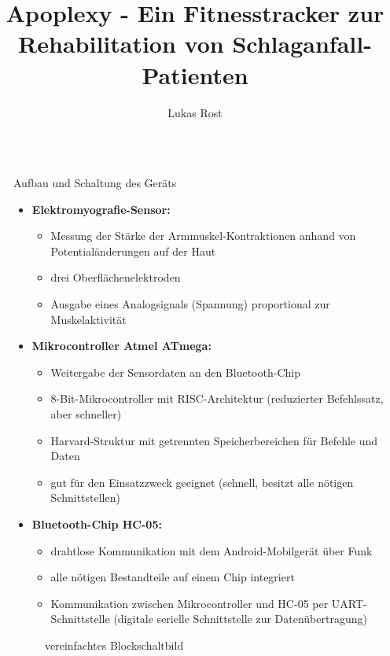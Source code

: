 \documentclass[final,20pt]{beamer}
\title{Apoplexy - Ein Fitnesstracker zur Rehabilitation von Schlaganfall-Patienten}
\author{Lukas Rost}
\institute{Albert-Schweitzer-Gymnasium Erfurt}
\newlength{\sepwidth}
\newlength{\colwidth}
\newcommand{\separatorcolumn}{\begin{column}{\sepwidth}\end{column}}
\begin{document}
\begin{frame}[t]
\begin{columns}[t]
\separatorcolumn

\begin{column}{\colwidth}
   \begin{alertblock}{Aufbau und Schaltung des Geräts}
  	\begin{itemize}
  		\item \textbf{Elektromyografie-Sensor:}
  		\begin{itemize}
  			\item Messung der Stärke der Armmuskel-Kontraktionen anhand von Potentialänderungen auf der Haut
  			\item drei Oberflächenelektroden
  			\item Ausgabe eines Analogsignals (Spannung) proportional zur Muskelaktivität
  		\end{itemize}
  		\item \textbf{Mikrocontroller Atmel ATmega:}
  		\begin{itemize}
  			\item Weitergabe der Sensordaten an den Bluetooth-Chip
  			\item 8-Bit-Mikrocontroller mit RISC-Architektur (reduzierter Befehlssatz, aber schneller)
  			\item Harvard-Struktur mit getrennten Speicherbereichen für Befehle und Daten
  			\item gut für den Einsatzzweck geeignet (schnell, besitzt alle nötigen Schnittstellen)
  		\end{itemize}
  		\item \textbf{Bluetooth-Chip HC-05:}
  		\begin{itemize}
  			\item drahtlose Kommunikation mit dem Android-Mobilgerät über Funk
  			\item alle nötigen Bestandteile auf einem Chip integriert
  			\item Kommunikation zwischen Mikrocontroller und HC-05 per UART-Schnittstelle (digitale serielle Schnittstelle zur Datenübertragung)
  		\end{itemize}
  	\end{itemize}
  
  	\begin{figure}[H]
  		\centering
  		
  		\caption{vereinfachtes Blockschaltbild}
  		\label{fig:mcsp}
  	\end{figure}
  \end{alertblock}


\end{column}
\end{columns}
\end{frame}
\end{document}
